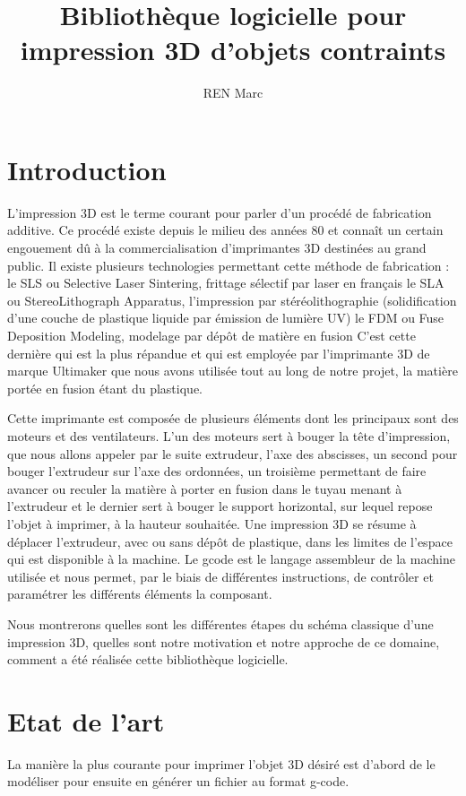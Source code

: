 \documentclass[11pt, titlepage]{article}
\author{REN Marc}
\title{Bibliothèque logicielle pour impression 3D d’objets contraints}
\begin{document}
\maketitle
\tableofcontents
\newpage
\section{Introduction}
L'impression 3D est le terme courant pour parler d'un procédé de fabrication additive. Ce procédé existe depuis le milieu des années 80 et connaît un certain engouement dû à la commercialisation d'imprimantes 3D destinées au grand public.
Il existe plusieurs technologies permettant cette méthode de fabrication :
le SLS ou Selective Laser Sintering, frittage sélectif par laser en français
le SLA ou StereoLithograph Apparatus, l'impression par stéréolithographie (solidification d'une couche de plastique liquide par émission de lumière UV)
le FDM ou Fuse Deposition Modeling, modelage par dépôt de matière en fusion
C'est cette dernière qui est la plus répandue et qui est employée par l'imprimante 3D de marque Ultimaker que nous avons utilisée tout au long de notre projet, la matière portée en fusion étant du plastique.

Cette imprimante est composée de plusieurs éléments dont les principaux sont des moteurs et des ventilateurs. L'un des moteurs sert à bouger la tête d'impression, que nous allons appeler par le suite extrudeur, l'axe des abscisses, un second pour bouger l'extrudeur sur l'axe des ordonnées, un troisième permettant de faire avancer ou reculer la matière à porter en fusion dans le tuyau menant à l'extrudeur et le dernier sert à bouger le support horizontal, sur lequel repose l'objet à imprimer, à la hauteur souhaitée.
Une impression 3D se résume à déplacer l'extrudeur, avec ou sans dépôt de plastique, dans les limites de l'espace qui est disponible à la machine. Le gcode est le langage assembleur de la machine utilisée et nous permet, par le biais de différentes instructions, de contrôler et paramétrer les différents éléments la composant.

Nous montrerons quelles sont les différentes étapes du schéma classique d'une impression 3D, quelles sont notre motivation et notre approche de ce domaine, comment a été réalisée cette bibliothèque logicielle.

\newpage
\section{Etat de l'art}
La manière la plus courante pour imprimer l'objet 3D désiré est d'abord de le modéliser pour ensuite en générer un fichier au format g-code.
\end{document}
